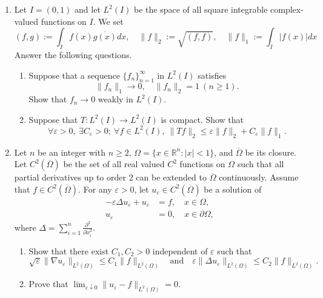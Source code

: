 \documentclass[10pt,a4paper]{article}
\begin{document}
\begin{enumerate}[label=\fbox{\arabic*}]
  \item %
        Let $I = (0, 1)$ and let $L^2(I)$ be the space of all square integrable complex-valued functions on $I$. We set
        \[
          (f, g) := \int_I f(x) \overline{g(x)} dx, \quad \|f\|_2 := \sqrt{(f, f)}, \quad \|f\|_1 := \int_I |f(x)| dx
        \]
        Answer the following questions.
        \begin{enumerate}[label=(\arabic*)]
          \item Suppose that a sequence $\{f_n\}_{n=1}^\infty$ in $L^2(I)$ satisfies
          \[
            \|f_n\|_1 \longrightarrow 0, \quad \|f_n\|_2 = 1 \ (n \ge 1).
          \]
          Show that $f_n \longrightarrow 0$ weakly in $L^2(I)$.
          \item Suppose that $T : L^2(I) \to L^2(I)$ is compact. Show that
          \[
            \forall \varepsilon > 0, \ \exists C_\varepsilon > 0; \ \forall f \in L^2(I), \ \|Tf\|_2 \le \varepsilon \|f\|_2 + C_\varepsilon \|f\|_1.
          \]
        \end{enumerate}

  \item %
        Let $n$ be an integer with $n \ge 2$, $\Omega = \{ x \in \mathbb{R}^n : |x| < 1 \}$, and $\overline{\Omega}$ be its closure. Let $C^2(\overline{\Omega})$ be the set of all real valued $C^2$ functions on $\Omega$ such that all partial derivatives up to order $2$ can be extended to $\overline{\Omega}$ continuously. Assume that $f \in C^2(\overline{\Omega})$. For any $\varepsilon > 0$, let $u_\varepsilon \in C^2(\overline{\Omega})$ be a solution of
        \begin{align*}
          -\varepsilon \Delta u_\varepsilon + u_\varepsilon &= f, \quad x \in \Omega, \\
          u_\varepsilon &= 0, \quad x \in \partial\Omega,
        \end{align*}
        where $\Delta = \sum_{i=1}^n \frac{\partial^2}{\partial x_i^2}$.
        \begin{enumerate}[label=(\roman*)]
          \item Show that there exist $C_1, C_2 > 0$ independent of $\varepsilon$ such that
          \[
            \sqrt{\varepsilon} \|\nabla u_\varepsilon\|_{L^2(\Omega)} \le C_1 \|f\|_{L^2(\Omega)} \quad \text{and} \quad \varepsilon \|\Delta u_\varepsilon\|_{L^2(\Omega)} \le C_2 \|f\|_{L^2(\Omega)}.
          \]
          \item Prove that $\lim_{\varepsilon \downarrow 0} \|u_\varepsilon - f\|_{L^2(\Omega)} = 0$.
        \end{enumerate}


\end{enumerate}
\end{document}
